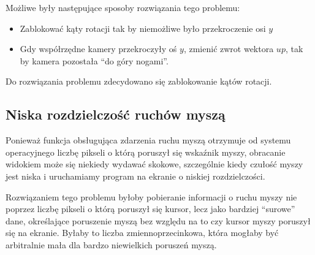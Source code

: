 \documentclass[a4paper]{article}
\begin{document}
Możliwe były następujące sposoby rozwiązania tego problemu:

\begin{itemize}
    \item Zablokować kąty rotacji tak by niemożliwe było przekroczenie osi $y$
    \item Gdy współrzędne kamery przekroczyły oś $y$, zmienić zwrot wektora
          $up$, tak by kamera pozostała ``do góry nogami''.
\end{itemize}

Do rozwiązania problemu zdecydowano się zablokowanie kątów rotacji.

\subsection{Niska rozdzielczość ruchów myszą}

Ponieważ funkcja obsługująca zdarzenia ruchu myszą otrzymuje od systemu
operacyjnego liczbę pikseli o którą poruszył się wskaźnik myszy, obracanie
widokiem może się niekiedy wydawać skokowe, szczególnie kiedy czułość myszy jest
niska i uruchamiamy program na ekranie o niskiej rozdzielczości.

Rozwiązaniem tego problemu byłoby pobieranie informacji o ruchu myszy nie
poprzez liczbę pikseli o którą poruszył się kursor, lecz jako bardziej
``surowe'' dane, określające poruszenie myszą bez względu na to czy kursor myszy
poruszył się na ekranie. Byłaby to liczba zmiennoprzecinkowa, która mogłaby być
arbitralnie mała dla bardzo niewielkich poruszeń myszą.
\end{document}
